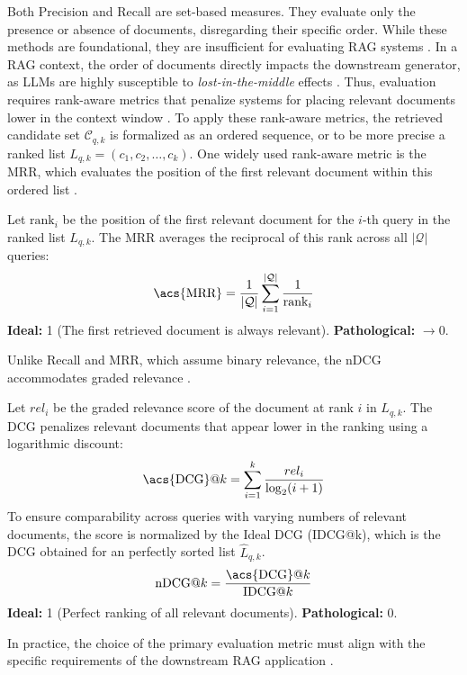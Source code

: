 Both Precision and Recall are set-based measures. They evaluate only the presence or absence of documents, disregarding their specific order. While these methods are foundational, they are insufficient for evaluating \ac{RAG} systems \citep[p. 158 f.]{manning2008introduction}\cite{es2023ragas}. In a \ac{RAG} context, the order of documents directly impacts the downstream generator, as \acp{LLM} are highly susceptible to \emph{lost-in-the-middle} effects \cite{Liu2023_LostInTheMiddle}. Thus, evaluation requires rank-aware metrics that penalize systems for placing relevant documents lower in the context window \citep[p. 159]{manning2008introduction}.  To apply these rank-aware metrics, the retrieved candidate set $\mathcal{C}_{q,k}$ is formalized as an ordered sequence, or to be more precise a ranked list $L_{q,k} = (c_1, c_2, \dots, c_k)$. One widely used rank-aware metric is the \ac{MRR}, which evaluates the position of the first relevant document within this ordered list \cite{gan2025retrieval}.


\begin{metricbox}
Let $\text{rank}_i$ be the position of the first relevant document for the $i$-th query in the ranked list $L_{q,k}$. The \acs{MRR} averages the reciprocal of this rank across all $|\mathcal{Q}|$ queries:
\begin{equation}
    \text{\acs{MRR}} = \frac{1}{|\mathcal{Q}|} \sum_{i=1}^{|\mathcal{Q}|} \frac{1}{\text{rank}_i}
\end{equation}
\textbf{Ideal:} 1 (The first retrieved document is always relevant). \quad \textbf{Pathological:} $\to 0$.
\end{metricbox}


Unlike Recall and \ac{MRR}, which assume binary relevance, the \ac{nDCG} accommodates graded relevance \citep[p. 162 f.]{manning2008introduction}\cite{gan2025retrieval}.

\begin{metricbox}
Let $rel_i$ be the graded relevance score of the document at rank $i$ in $L_{q,k}$. The \acs{DCG} penalizes relevant documents that appear lower in the ranking using a logarithmic discount:
\begin{equation}
    \text{\acs{DCG}@}k = \sum_{i=1}^k \frac{rel_i}{\log_2(i+1)}
\end{equation}
To ensure comparability across queries with varying numbers of relevant documents, the score is normalized by the Ideal \acs{DCG} (IDCG@k), which is the \acs{DCG} obtained for an perfectly sorted list $\hat{L}_{q,k}$.
\begin{equation}
    \text{nDCG@}k = \frac{\text{\acs{DCG}@}k}{\text{IDCG@}k}
\end{equation}
\textbf{Ideal:} 1 (Perfect ranking of all relevant documents). \quad \textbf{Pathological:} 0.
\end{metricbox}

In practice, the choice of the primary evaluation metric must align with the specific requirements of the downstream \ac{RAG} application \cite{gao_2024_rag,gan2025retrieval}.
